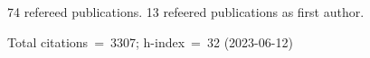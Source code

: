 74 refereed publications. 13 refeered publications as first author.

Total citations~=~3307; h-index~=~32 (2023-06-12)